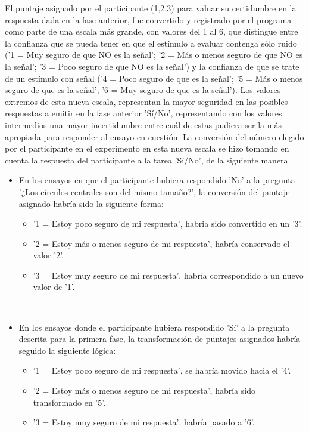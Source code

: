 \begin{itemize}
El puntaje asignado por el participante (1,2,3) para valuar su certidumbre en la respuesta dada en la fase anterior, fue convertido y registrado por el programa como parte de una escala más grande, con valores del 1 al 6, que distingue entre la confianza que se pueda tener en que el estímulo a evaluar contenga sólo ruido ('1 = Muy seguro de que NO es la señal'; '2 =  Más o menos seguro de que NO es la señal'; '3 = Poco seguro de que NO es la señal') y la confianza de que se trate de un estímulo con señal ('4 = Poco seguro de que es la señal'; '5 = Más o menos seguro de que es la señal'; '6 = Muy seguro de que es la señal'). Los valores extremos de esta nueva escala, representan la mayor seguridad en las posibles respuestas a emitir en la fase anterior 'Sí/No', representando con los valores intermedios una mayor incertidumbre entre cuál de estas pudiera ser la más apropiada para responder al ensayo en cuestión. La conversión del número elegido por el participante en el experimento en esta nueva escala se hizo tomando en cuenta la respuesta del participante a la tarea 'Sí/No', de la siguiente manera.\\

\begin{itemize}
\item En los ensayos en que el participante hubiera respondido 'No' a la pregunta '¿Los círculos centrales son del mismo tamaño?', la conversión del puntaje asignado habría sido la siguiente forma:\\
	\begin{itemize}
	\item '1 = Estoy poco seguro de mi respuesta', habria sido convertido en un '3'.\\
	\item '2 = Estoy más o menos seguro de mi respuesta', habría conservado el valor '2'.\\
	\item '3 = Estoy muy seguro de mi respuesta', habría correspondido a un nuevo valor de '1'.\\
	\end{itemize}
\\
\item En los ensayos donde el participante hubiera respondido 'Sí' a la pregunta descrita para la primera fase, la transformación de puntajes asignados habría seguido la siguiente lógica:\\
	\begin{itemize}
	\item '1 = Estoy poco seguro de mi respuesta', se habría movido hacia el '4'.\\
	\item '2 = Estoy más o menos seguro de mi respuesta', habría sido transformado en '5'.\\
	\item '3 = Estoy muy seguro de mi respuesta', habría pasado a '6'.\\
	\end{itemize}
\end{itemize}


\end{itemize}
